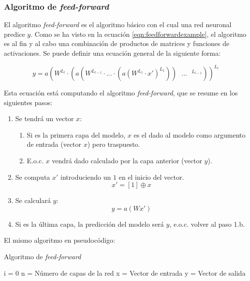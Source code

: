 \subsubsection{Algoritmo de \textit{feed-forward}}\label{feedforward}
El algoritmo \textit{feed-forward} es el algoritmo básico con el cual una red neuronal predice $y$. Como se ha visto en la ecuación \ref{eqn:feedforwardexample}, el algoritmo es al fin y al cabo una combinación de productos de matrices y funciones de activaciones. Se puede definir una ecuación general de la siguiente forma:

\begin{equation}
    y = a(W^{L_l} \cdot (a(W^{L_{l-1}} \cdot ... \cdot (a(W^{L_1} \cdot x')^{L_1})) \text{ } ... \text{ } ^{L_{l-1}}))^{L_l}
    \label{eqn:feedforward}
\end{equation}

Esta ecuación está computando el algoritmo \textit{feed-forward}, que se resume en los siguientes pasos:

\begin{enumerate}
\item Se tendrá un vector $x$:
\begin{enumerate}
    \item Si es la primera capa del modelo, $x$ es el dado al modelo como argumento de entrada (vector $x$) pero traspuesto.
    \item E.o.c. $x$ vendrá dado calculado por la capa anterior (vector $y$).
\end{enumerate}
\item Se computa $x'$ introduciendo un $1$ en el inicio del vector.
\begin{equation}
  x' = [1] \oplus x
\end{equation}

\item Se calculará $y$:
\begin{equation}
  y = a(Wx')
\end{equation}
\item Si es la última capa, la predicción del modelo será $y$, e.o.c. volver al paso 1.b.
\end{enumerate}

El mismo algoritmo en pseudocódigo:

\begin{algorithm}[H]
\caption{Algoritmo de \textit{feed-forward}}
\SetAlgoLined
{}
 i = 0\;
 n = Número de capas de la red\;
 x = Vector de entrada\;
 y = Vector de salida\;
\end{algorithm}


